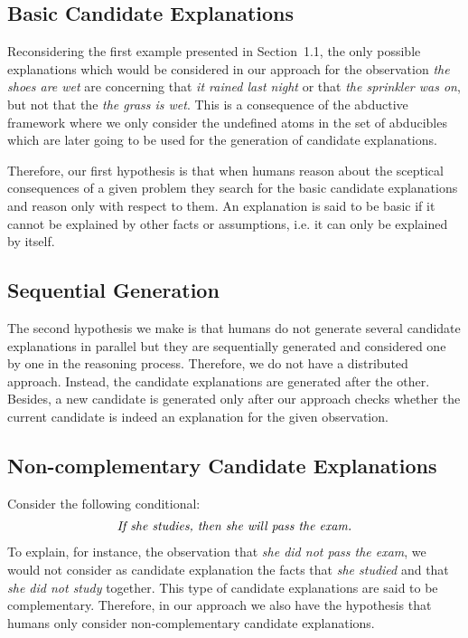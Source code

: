 \subsection{Basic Candidate Explanations}

Reconsidering the first example presented in Section~1.1, the only possible explanations which would be considered in our approach for the observation \textit{the shoes are wet} are concerning that \textit{it rained last night} or that \textit{the sprinkler was on}, but not that the \textit{the grass is wet}. This is a consequence of the abductive framework where we only consider the undefined atoms in the set of abducibles which are later going to be used for the generation of candidate explanations. 

Therefore, our first hypothesis is that when humans reason about the sceptical consequences of a given problem they search for the basic candidate explanations and reason only with respect to them. An explanation is said to be basic if it cannot be explained by other facts or assumptions, i.e. it can only be explained by itself.

\subsection{Sequential Generation}

The second hypothesis we make is that humans do not generate several candidate explanations in parallel but they are sequentially generated and considered one by one in the reasoning process. Therefore, we do not have a distributed approach. Instead, the candidate explanations are generated after the other. Besides, a new candidate is generated only after our approach checks whether the current candidate is indeed an explanation for the given observation.

\subsection{Non-complementary Candidate Explanations}

Consider the following conditional: 
\[
\begin{array}{l}
\mbox{\textit{If she studies, then she will pass the exam.}}\\
\end{array}
\]
To explain, for instance, the observation that \textit{she did not pass the exam}, we would not consider as candidate explanation the facts that \textit{she studied} and that \textit{she did not study} together. This type of candidate explanations are said to be complementary. Therefore, in our approach we also have the hypothesis that humans only consider non-complementary candidate explanations.

